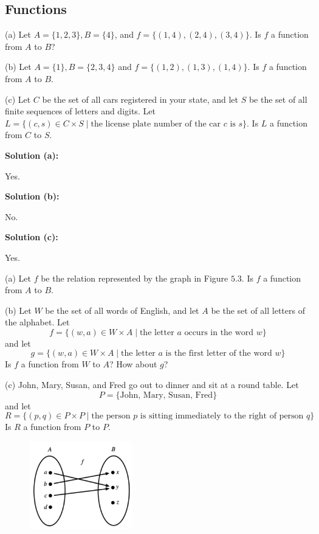 \subsection{Functions}

\begin{tcolorbox}[title=Problem 1, breakable]
    (a) Let $A = \{1, 2, 3\}, B = \{4\}$, and 
        $f = \{(1, 4), (2, 4), (3, 4)\}$.
        Is $f$ a function from $A$ to $B$?

    (b) Let $A = \{1\}, B = \{2, 3, 4\}$ and
        $f = \{(1, 2), (1, 3), (1, 4)\}$.
        Is $f$ a function from $A$ to $B$.

    (c) Let $C$ be the set of all cars registered
        in your state, and let $S$ be the set of all
        finite sequences of letters and digits.
        Let $L = \{(c, s) \in C \times S \mid 
            \text{the license plate number of the car $c$ is $s$}\}$.
        Is $L$ a function from $C$ to $S$.
\end{tcolorbox}

\textbf{Solution (a):}

Yes.

\textbf{Solution (b):}

No.

\textbf{Solution (c):}

Yes.

\begin{tcolorbox}[title=Problem 2, breakable]
    (a) Let $f$ be the relation represented by the graph in Figure $5.3$.
        Is $f$ a function from $A$ to $B$.

    (b) Let $W$ be the set of all words of English, and let $A$ be the set 
        of all letters of the alphabet. 
        Let 
        \[f = \{(w, a) \in W \times A \mid \text{the letter $a$ occurs in the word $w$}\}\]
        and let 
        \[g = \{(w, a) \in W \times A \mid \text{the letter $a$ is the first letter of the word $w$}\}\]
        Is $f$ a function from $W$ to $A$?
        How about $g$?

    (c) John, Mary, Susan, and Fred go out to dinner and sit at a round table.
        Let 
        \[P = \{\text{John, Mary, Susan, Fred}\}\]
        and let 
        \[R = \{(p, q) \in P \times P \mid \text{the person $p$ is sitting immediately to the right of person $q$}\}\]
        Is $R$ a function from $P$ to $P$.
\end{tcolorbox}

\begin{figure}[h]
    \centering
    \includegraphics[width=0.4\textwidth]{images/func.png}
\end{figure}

